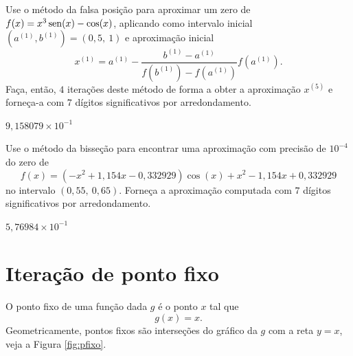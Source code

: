 \begin{exer}\label{exer:falsapos_1}
  Use o método da falsa posição para aproximar um zero de $f(x)=x^3\operatorname{sen}(x)-\cos(x)$, aplicando como intervalo inicial $(a^{(1)}, b^{(1)}) = (0,5, ~1)$ e aproximação inicial
  \begin{equation}
    x^{(1)} = a^{(1)} - \frac{b^{(1)}-a^{(1)}}{f(b^{(1)})-f(a^{(1)})}f(a^{(1)}).
  \end{equation}
Faça, então, $4$ iterações deste método de forma a obter a aproximação $x^{(5)}$ e forneça-a com $7$ dígitos significativos por arredondamento.
\end{exer}
\begin{resp}
  $9,158079\times 10^{-1}$
\end{resp}

\begin{exer}\label{exer:falsapos_multpar}
  Use o método da bisseção para encontrar uma aproximação com precisão de $10^{-4}$ do zero de
  \begin{equation}
    f(x) = (-x^2+1,154x-0,332929)\cos(x) + x^2 - 1,154x + 0,332929
  \end{equation}
no intervalo $(0,55, ~0,65)$. Forneça a aproximação computada com $7$ dígitos significativos por arredondamento.
\end{exer}
\begin{resp}
  $5,76984\times 10^{-1}$
\end{resp}

\section{Iteração de ponto fixo}\label{cap_eq1d_pfixo}

O ponto fixo de uma função dada $g$ é o ponto $x$ tal que
\begin{equation}
  g(x) = x.
\end{equation}
Geometricamente, pontos fixos são interseções do gráfico da $g$ com a reta $y=x$, veja a Figura \ref{fig:pfixo}.


